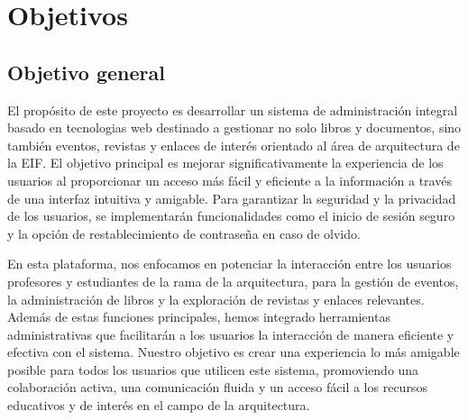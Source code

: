 \documentclass[a4paper, 12pt]{book}
\begin{document}
\cleardoublepage %
\chapter{Objetivos} %
\label{chap:objetivos} %

\section{Objetivo general} %
\label{sec:objetivo-general} %
El propósito de este proyecto es desarrollar un sistema de administración integral basado en tecnologias web destinado a gestionar no solo libros y documentos, sino también eventos, revistas y enlaces de interés orientado al área de arquitectura de la EIF. El objetivo principal es mejorar significativamente la experiencia de los usuarios al proporcionar un acceso más fácil y eficiente a la información a través de una interfaz intuitiva y amigable. Para garantizar la seguridad y la privacidad de los usuarios, se implementarán funcionalidades como el inicio de sesión seguro y la opción de restablecimiento de contraseña en caso de olvido.

En esta plataforma, nos enfocamos en potenciar la interacción entre los usuarios profesores y estudiantes de la rama de la arquitectura, para la gestión de eventos, la administración de libros y la exploración de revistas y enlaces relevantes. Además de estas funciones principales, hemos integrado herramientas administrativas que facilitarán a los usuarios la interacción de manera eficiente y efectiva con el sistema. Nuestro objetivo es crear una experiencia lo más amigable posible para todos los usuarios que utilicen este sistema, promoviendo una colaboración activa, una comunicación fluida y un acceso fácil a los recursos educativos y de interés en el campo de la arquitectura.
\end{document}
